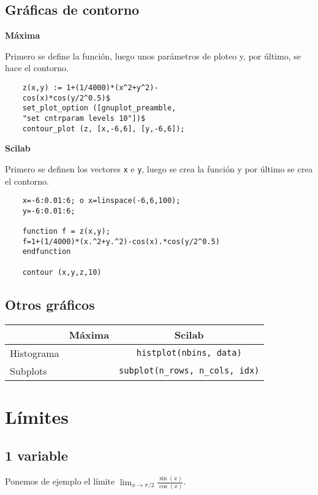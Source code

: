 \documentclass[a4paper]{article}
\begin{document}
\subsection{Gráficas de contorno}
\begin{multicols}{2}
	\begin{center}
		\textbf{Máxima}
	\end{center}
	Primero se define la función, luego unos parámetros de ploteo y, por último, se hace el contorno.
	\begin{verbatim}
	z(x,y) := 1+(1/4000)*(x^2+y^2)-
	cos(x)*cos(y/2^0.5)$
	set_plot_option	([gnuplot_preamble, 
	"set cntrparam levels 10"])$
	contour_plot (z, [x,-6,6], [y,-6,6]);
	\end{verbatim}
	\columnbreak
	
	
	\begin{center}
		\textbf{Scilab}
	\end{center}
	
	Primero se definen los vectores \verb|x| e \verb|y|, luego se crea la función y por último se crea el contorno.
	\begin{verbatim}
	x=-6:0.01:6; o x=linspace(-6,6,100);
	y=-6:0.01:6; 
	
	function f = z(x,y);
	f=1+(1/4000)*(x.^2+y.^2)-cos(x).*cos(y/2^0.5)
	endfunction
	
	contour (x,y,z,10)
	\end{verbatim}
	
\end{multicols}

\subsection{Otros gráficos}
\centering
\begin{tabular}{lcc}
	& Máxima & Scilab \\ \midrule
	Histograma &  & \verb|histplot(nbins, data)|\\
	Subplots &  & \verb|subplot(n_rows, n_cols, idx)| 	 \\

\end{tabular}

\raggedright
\section{Límites}
\subsection{1 variable}
Ponemos de ejemplo el límite $\lim_{x\rightarrow\pi/2} \frac{\sin(x)}{\cos(x)}$.
\end{document}
